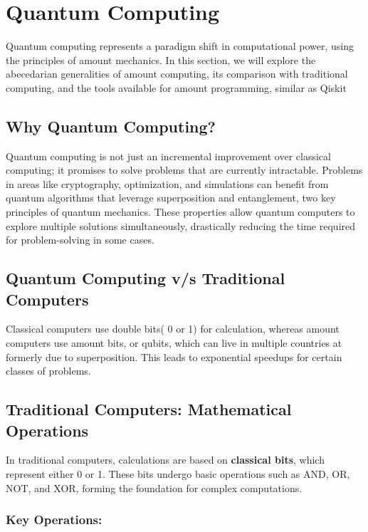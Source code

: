 \documentclass[12pt,a4paper]{article}
\begin{document}
\newpage

\begin{center}
    \fontsize{14}{16}\selectfont \bfseries
    \section{Quantum Computing}
    \end{center}

Quantum computing represents a paradigm shift in computational power, using the principles of amount mechanics. In this section, we will explore the abecedarian generalities of amount computing, its comparison with traditional computing, and the tools available for amount programming, similar as Qiskit

\subsection{Why Quantum Computing?}
Quantum computing is not just an incremental improvement over classical computing; it promises to solve problems that are currently intractable. Problems in areas like cryptography, optimization, and simulations can benefit from quantum algorithms that leverage superposition and entanglement, two key principles of quantum mechanics. These properties allow quantum computers to explore multiple solutions simultaneously, drastically reducing the time required for problem-solving in some cases.

\subsection{Quantum Computing v/s Traditional Computers}
 Classical computers use  double bits( 0 or 1) for  calculation, whereas amount computers use amount bits, or qubits, which can  live in multiple  countries at  formerly due to superposition. This leads to exponential speedups for certain classes of problems. 


\subsection{Traditional Computers: Mathematical Operations}

In traditional computers, calculations are based on \textbf{classical bits}, which represent either 0 or 1. These bits undergo basic operations such as AND, OR, NOT, and XOR, forming the foundation for complex computations.

\subsubsection{Key Operations:}
\end{document}

